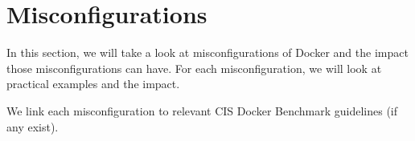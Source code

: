 \section{Misconfigurations}\label{section:misconfigurations}
In this section, we will take a look at misconfigurations of Docker and the impact those misconfigurations can have. For each misconfiguration, we will look at practical examples and the impact.

\medskip

We link each misconfiguration to relevant CIS Docker Benchmark guidelines (if any exist).








